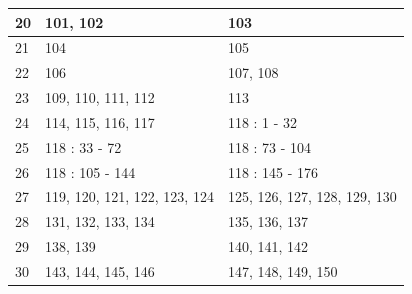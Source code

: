 {\begin{table}[h]
\begin{tabular}{|l|l|l|}
  20   & 101, 102                     & 103                          \\ \hline
  21   & 104                          & 105                          \\ \hline
  22   & 106                          & 107, 108                     \\ \hline
  23   & 109, 110, 111, 112           & 113                          \\ \hline
  24   & 114, 115, 116, 117           & 118 : 1 - 32                 \\ \hline
  25   & 118 : 33 - 72                & 118 : 73 - 104               \\ \hline
  26   & 118 : 105 - 144              & 118 : 145 - 176              \\ \hline
  27   & 119, 120, 121, 122, 123, 124 & 125, 126, 127, 128, 129, 130 \\ \hline
  28   & 131, 132, 133, 134           & 135, 136, 137                \\ \hline
  29   & 138, 139                     & 140, 141, 142                \\ \hline
  30   & 143, 144, 145, 146           & 147, 148, 149, 150           \\ \hline
  \end{tabular}
  \end{table}
}

\newpage
